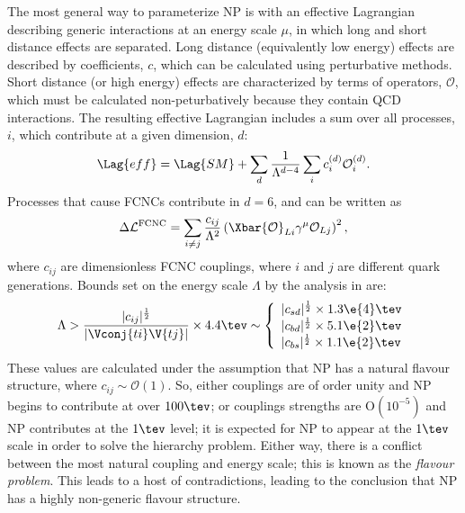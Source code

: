 The most general way to parameterize NP is with an effective Lagrangian describing generic
interactions at an energy scale $\mu$, in which long and short distance effects are separated.
Long distance (equivalently low energy) effects are described by coefficients, $c$, which can be
calculated using perturbative methods.
Short distance (or high energy) effects are characterized by terms of operators, $\mathcal{O}$,
which must be calculated non-peturbatively because they contain QCD interactions.
The resulting effective Lagrangian includes a sum over all processes, $i$, which contribute at a
given dimension, $d$:
\begin{equation}
  \Lag{eff}
  =
  \Lag{SM} + \sum_d\frac1{\Lambda^{d-4}}
  \sum_ic_i^{(d)}\mathcal{O}_i^{(d)}.
  \label{eq:th:lageff}
\end{equation}
Processes that cause FCNCs contribute in $d=6$, and can be written as
\begin{equation}
  \Delta\mathcal{L}^\mathrm{FCNC}
  =
  \sum_{i\neq j}\frac{c_{ij}}{\Lambda^2}
  \left(\Xbar{\mathcal{O}}_{Li}\gamma^\mu\mathcal{O}_{Lj}\right)^2,
\end{equation}
where $c_{ij}$ are dimensionless FCNC couplings, where $i$ and $j$ are different quark generations.
Bounds set on the energy scale $\Lambda$ by the analysis in  are:
\begin{equation}
  \Lambda > \frac{|c_{ij}|^\frac12}{|\Vconj{ti}\V{tj}|}\times4.4\tev
  \sim
  \left\{
    \begin{array}{l}
      |c_{sd}|^\frac12\times 1.3\e{4}\tev \\
      |c_{bd}|^\frac12\times 5.1\e{2}\tev \\
      |c_{bs}|^\frac12\times 1.1\e{2}\tev \\
    \end{array}\right.
\end{equation}
These values are calculated under the assumption that NP has a natural flavour structure, where
$c_{ij}\sim\mathcal{O}(1)$.
So, either couplings are of order unity and NP begins to contribute at over $100\tev$; or couplings
strengths are $\mathrm{O}(10^{-5})$ and NP contributes at the $1\tev$ level;
it is expected for NP to appear at the $1\tev$ scale in order to solve the hierarchy problem.
Either way, there is a conflict between the most natural coupling and energy scale; this is known
as the \emph{flavour problem}.
This leads to a host of contradictions, leading to the conclusion that NP has a highly non-generic
flavour structure.

